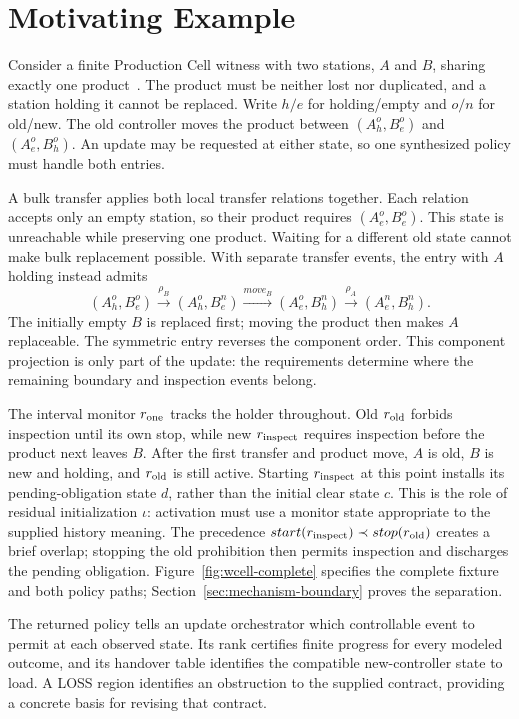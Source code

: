 \documentclass[acmsmall,screen,review,anonymous]{acmart}
\begin{document}
\section{Motivating Example}
\label{sec:example}


Consider a finite Production Cell witness with two stations, $A$ and $B$, sharing exactly one product~\cite{Lewerentz1995ProductionCell,Nahabedian2020}. The product must be neither lost nor duplicated, and a station holding it cannot be replaced. Write $h/e$ for holding/empty and $o/n$ for old/new. The old controller moves the product between $(A_h^o,B_e^o)$ and $(A_e^o,B_h^o)$. An update may be requested at either state, so one synthesized policy must handle both entries.

A bulk transfer applies both local transfer relations together. Each relation accepts only an empty station, so their product requires $(A_e^o,B_e^o)$. This state is unreachable while preserving one product. Waiting for a different old state cannot make bulk replacement possible. With separate transfer events, the entry with $A$ holding instead admits
\[
(A_h^o,B_e^o)\xrightarrow{\rho_B}(A_h^o,B_e^n)
\xrightarrow{move_B}(A_e^o,B_h^n)
\xrightarrow{\rho_A}(A_e^n,B_h^n).
\]
The initially empty $B$ is replaced first; moving the product then makes $A$ replaceable. The symmetric entry reverses the component order. This component projection is only part of the update: the requirements determine where the remaining boundary and inspection events belong.

The interval monitor $r_{\rm one}$ tracks the holder throughout. Old $r_{\rm old}$ forbids inspection until its own stop, while new $r_{\rm inspect}$ requires inspection before the product next leaves $B$. After the first transfer and product move, $A$ is old, $B$ is new and holding, and $r_{\rm old}$ is still active. Starting $r_{\rm inspect}$ at this point installs its pending-obligation state $d$, rather than the initial clear state $c$. This is the role of residual initialization $\iota$: activation must use a monitor state appropriate to the supplied history meaning. The precedence $start(r_{\rm inspect})\prec stop(r_{\rm old})$ creates a brief overlap; stopping the old prohibition then permits inspection and discharges the pending obligation. Figure~\ref{fig:wcell-complete} specifies the complete fixture and both policy paths; Section~\ref{sec:mechanism-boundary} proves the separation.

The returned policy tells an update orchestrator which controllable event to permit at each observed state. Its rank certifies finite progress for every modeled outcome, and its handover table identifies the compatible new-controller state to load. A LOSS region identifies an obstruction to the supplied contract, providing a concrete basis for revising that contract.
\end{document}

